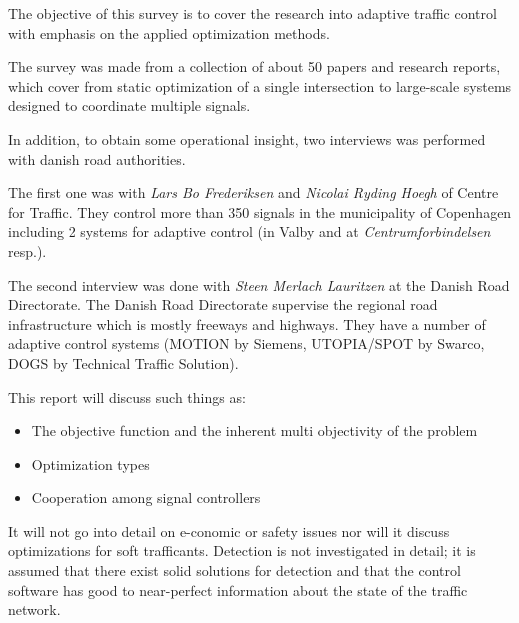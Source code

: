 \label{scope}
The objective of this survey is to cover the research into adaptive traffic control with emphasis on the applied optimization methods.

The survey was made from a collection of about 50 papers and research reports, which cover from static optimization of a single intersection to large-scale systems designed to coordinate multiple signals. 

In addition, to obtain some operational insight, two interviews was performed with danish road authorities. 

The first one was with \textit{Lars Bo Frederiksen} and \textit{Nicolai Ryding Hoegh} of Centre for Traffic. They control more than 350 signals in the municipality of Copenhagen including 2 systems for adaptive control (in Valby and at \textit{Centrumforbindelsen} resp.). 

The second interview was done with \textit{Steen Merlach Lauritzen} at the Danish Road Directorate. The Danish Road Directorate supervise the regional road infrastructure which is mostly freeways and highways. They have a number of adaptive control systems (MOTION by Siemens, UTOPIA/SPOT by Swarco, DOGS by Technical Traffic Solution).

This report will discuss such things as:

\begin{itemize}
\item The objective function and the inherent multi objectivity of the problem
\item Optimization types
\item Cooperation among signal controllers
\end{itemize}

It will not go into detail on e-conomic or safety issues nor will it discuss optimizations for soft trafficants. Detection is not investigated in detail; it is assumed that there exist solid solutions for detection and that the control software has good to near-perfect information about the state of the traffic network.

